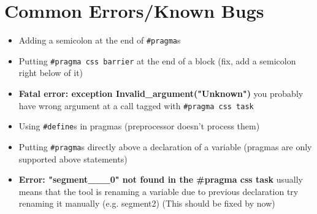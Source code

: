 \documentclass[a4paper]{article}
\begin{document}
\section{Common Errors/Known Bugs}

\begin{itemize}
  \item Adding a semicolon at the end of \verb!#pragma!s
  \item Putting \verb!#pragma css barrier! at the end of a block (fix, add a semicolon right below of it)
  \item \textbf{{Fatal error: exception Invalid\_argument("Unknown")}} you
      probably have wrong argument at a call tagged with \verb!#pragma css task!
  \item Using \verb!#define!s in pragmas (preprocessor doesn't process them)
  \item Putting \verb!#pragma!s directly above a declaration of a variable (pragmas are only supported above statements)
  \item \textbf{Error: "segment\_\_\_0" not found in the \#pragma css task} 
  usually means that the tool is renaming a variable due to previous declaration
  try renaming it manually (e.g. segment2) (This should be fixed by now)
\end{itemize}
\end{document}
